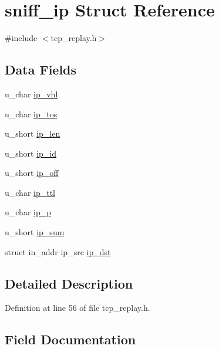 \hypertarget{structsniff__ip}{}\section{sniff\+\_\+ip Struct Reference}
\label{structsniff__ip}


{\ttfamily \#include $<$tcp\+\_\+replay.\+h$>$}

\subsection*{Data Fields}
\begin{DoxyCompactItemize}
\item 
u\+\_\+char \hyperlink{structsniff__ip_a338cb46af72e0f8008ded9b42a299f6d}{ip\+\_\+vhl}
\item 
u\+\_\+char \hyperlink{structsniff__ip_a4986aa9ceefec1747557b5a4ad2ae156}{ip\+\_\+tos}
\item 
u\+\_\+short \hyperlink{structsniff__ip_a6f0eea621a11c187c9082f5e0881bda5}{ip\+\_\+len}
\item 
u\+\_\+short \hyperlink{structsniff__ip_ad40226ab143ba278ec281655bda351b4}{ip\+\_\+id}
\item 
u\+\_\+short \hyperlink{structsniff__ip_a825494b1901febb5e1fd59380c9c345d}{ip\+\_\+off}
\item 
u\+\_\+char \hyperlink{structsniff__ip_a05ffe72d8f2e9502c83581ca2a9465f5}{ip\+\_\+ttl}
\item 
u\+\_\+char \hyperlink{structsniff__ip_a0ee4f3388dcd937498bbc9819e8141c8}{ip\+\_\+p}
\item 
u\+\_\+short \hyperlink{structsniff__ip_a8554cc921451046869f0fca355b859c8}{ip\+\_\+sum}
\item 
struct in\+\_\+addr ip\+\_\+src \hyperlink{structsniff__ip_a5f30cc97e0e8b1be5a44b18065ae6f08}{ip\+\_\+dst}
\end{DoxyCompactItemize}


\subsection{Detailed Description}


Definition at line 56 of file tcp\+\_\+replay.\+h.



\subsection{Field Documentation}
\mbox{\label{structsniff__ip_a5f30cc97e0e8b1be5a44b18065ae6f08}} 
